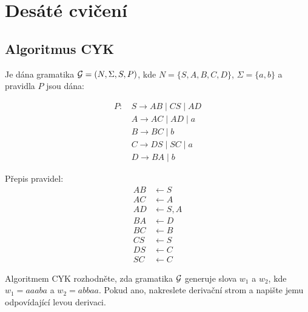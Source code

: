 \section{Desáté cvičení}
 
\subsection{Algoritmus CYK} %
Je dána gramatika $\mathcal{G} = (N, \Sigma, S, P)$, kde 
$N = \{S, A, B, C, D\}$, $\Sigma = \{a, b\}$ a pravidla $P$ jsou dána:
\begin{multicols}{2}
    \begin{align*}
        P \text{: } & S \rightarrow AB \mid CS \mid AD \\
           & A \rightarrow AC \mid AD \mid a \\
           & B \rightarrow BC \mid b \\
           & C \rightarrow DS \mid SC \mid a \\
           & D \rightarrow BA \mid b
    \end{align*}

\columnbreak

    Přepis pravidel:
    \begin{align*}
        AB & \leftarrow S \\
        AC & \leftarrow A \\
        AD & \leftarrow S, A \\
        BA & \leftarrow D \\
        BC & \leftarrow B \\
        CS & \leftarrow S \\
        DS & \leftarrow C \\
        SC & \leftarrow C
    \end{align*}
\end{multicols}
Algoritmem CYK rozhodněte, zda gramatika $\mathcal{G}$ generuje slova $w_1$ a $w_2$, kde $w_1 = aaaba$ a $w_2 = abbaa$.  
Pokud ano, nakreslete derivační strom a napište jemu odpovídající levou derivaci.

